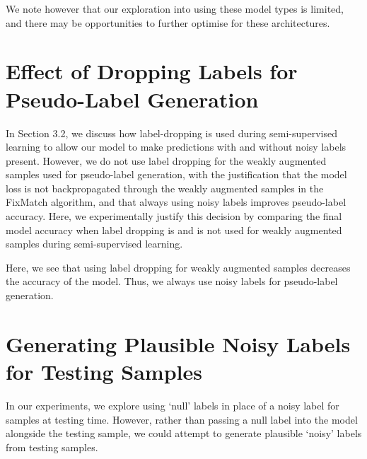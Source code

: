 \documentclass[10pt,twocolumn,letterpaper]{article}
\begin{document}
We note however that our exploration into using these model types is limited, and there may be opportunities to further optimise for these architectures.

\section{Effect of Dropping Labels for Pseudo-Label Generation}

In Section 3.2, we discuss how label-dropping is used during semi-supervised learning to allow our model to make predictions with and without noisy labels present. However, we do not use label dropping for the weakly augmented samples used for pseudo-label generation, with the justification that the model loss is not backpropagated through the weakly augmented samples in the FixMatch algorithm, and that always using noisy labels improves pseudo-label accuracy. Here, we experimentally justify this decision by comparing the final model accuracy when label dropping is and is not used for weakly augmented samples during semi-supervised learning.

\begin{table}[ht!]
    \begin{center}
    \end{center}
    \caption{\small Effect of Label Dropping on Final Accuracy for Asym. 40\% noise on CIFAR10} 
    \label{tab:label_dropping_ablation}
\end{table}

Here, we see that using label dropping for weakly augmented samples decreases the accuracy of the model. Thus, we always use noisy labels for pseudo-label generation.

\section{Generating Plausible Noisy Labels for Testing Samples}

In our experiments, we explore using `null' labels in place of a noisy label for samples at testing time. However, rather than passing a null label into the model alongside the testing sample, we could attempt to generate plausible `noisy' labels from testing samples.
\end{document}
